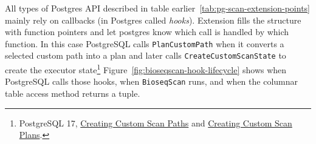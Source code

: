 All types of Postgres API described in table earlier~\ref{tab:pg-scan-extension-points} mainly rely on callbacks (in Postgres called \emph{hooks}). Extension fills the structure with function pointers and let postgres know which call is handled by which function.
In this case PostgreSQL calls \texttt{PlanCustomPath} when it converts a selected custom
path into a plan and later calls \texttt{CreateCustomScanState} to create the
executor state\footnote{PostgreSQL
17, \href{https://www.postgresql.org/docs/17/custom-scan-path.html}
{Creating Custom Scan Paths} and
\href{https://www.postgresql.org/docs/17/custom-scan-plan.html}
{Creating Custom Scan Plans}.}
Figure~\ref{fig:bioseqscan-hook-lifecycle} shows when PostgreSQL calls those hooks, when \texttt{BioseqScan} runs, and when the columnar table access method returns a tuple.

